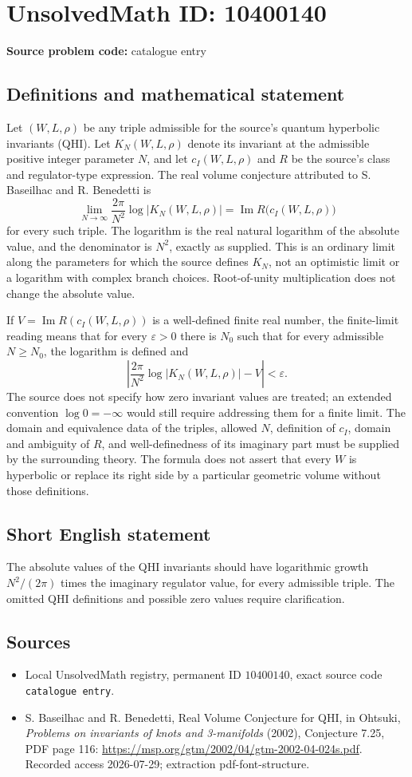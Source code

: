 \documentclass[11pt]{article}
\begin{document}
\section*{UnsolvedMath ID: 10400140}
\textbf{Source problem code:} catalogue entry
\subsection{Definitions and mathematical statement}
Let \((W,L,\rho)\) be any triple admissible for the source's quantum hyperbolic invariants (QHI). Let \(K_N(W,L,\rho)\) denote its invariant at the admissible positive integer parameter \(N\), and let \(c_I(W,L,\rho)\) and \(R\) be the source's class and regulator-type expression. The real volume conjecture attributed to S. Baseilhac and R. Benedetti is
\[\lim_{N\to\infty}\frac{2\pi}{N^2}\log\bigl|K_N(W,L,\rho)\bigr|
=\operatorname{Im}R\bigl(c_I(W,L,\rho)\bigr)\]
for every such triple. The logarithm is the real natural logarithm of the absolute value, and the denominator is \(N^2\), exactly as supplied. This is an ordinary limit along the parameters for which the source defines \(K_N\), not an optimistic limit or a logarithm with complex branch choices. Root-of-unity multiplication does not change the absolute value.

If \(V=\operatorname{Im}R(c_I(W,L,\rho))\) is a well-defined finite real number, the finite-limit reading means that for every \(\varepsilon>0\) there is \(N_0\) such that for every admissible \(N\geq N_0\), the logarithm is defined and
\[\left|\frac{2\pi}{N^2}\log|K_N(W,L,\rho)|-V\right|<\varepsilon.\]
The source does not specify how zero invariant values are treated; an extended convention \(\log0=-\infty\) would still require addressing them for a finite limit. The domain and equivalence data of the triples, allowed \(N\), definition of \(c_I\), domain and ambiguity of \(R\), and well-definedness of its imaginary part must be supplied by the surrounding theory. The formula does not assert that every \(W\) is hyperbolic or replace its right side by a particular geometric volume without those definitions.
\subsection{Short English statement}
The absolute values of the QHI invariants should have logarithmic growth \(N^2/(2\pi)\) times the imaginary regulator value, for every admissible triple. The omitted QHI definitions and possible zero values require clarification.
\subsection{Sources}
\begin{itemize}
\item Local UnsolvedMath registry, permanent ID \(10400140\), exact source code \texttt{catalogue entry}.
\item S. Baseilhac and R. Benedetti, Real Volume Conjecture for QHI, in Ohtsuki, \emph{Problems on invariants of knots and 3-manifolds} (2002), Conjecture 7.25, PDF page 116: \url{https://msp.org/gtm/2002/04/gtm-2002-04-024s.pdf}. Recorded access 2026-07-29; extraction pdf-font-structure.
\end{itemize}
\end{document}
